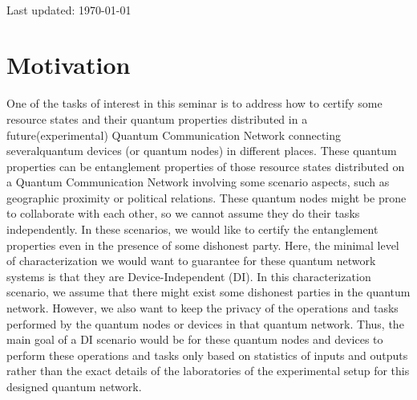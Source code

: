 \documentclass[12pt]{article}
\begin{document}
\begin{titlepage}
\begin{minipage}{0.75\textwidth}
    \end{minipage}\\[2cm]
    \vspace{-1cm}    
    
    
    {\large{Last updated: \today}}\\[2cm] %
    
    \vfill %

    \end{titlepage}

    \clearpage

    
    \section{Motivation}
    \label{sec:motivation}

    One of the tasks of interest in this seminar is to address how to certify some resource states and their quantum properties distributed in a future\break (experimental) Quantum Communication Network connecting several\break quantum devices (or quantum nodes) in different places. These quantum properties can be entanglement properties of those resource states distributed on a Quantum Communication Network involving some scenario aspects, such as geographic proximity or political relations. These quantum nodes might be prone to collaborate with each other, so we cannot assume they do their tasks independently. In these scenarios, we would like to certify the entanglement properties even in the presence of some dishonest party. Here, the minimal level of characterization we would want to guarantee for these quantum network systems is that they are Device-Independent (DI). In this characterization scenario, we assume that there might exist some dishonest parties in the quantum network. However, we also want to keep the privacy of the operations and tasks performed by the quantum nodes or devices in that quantum network. Thus, the main goal of a DI scenario would be for these quantum nodes and devices to perform these operations and tasks only based on statistics of inputs and outputs rather than the exact details of the laboratories of the experimental setup for this designed quantum network.
\end{document}
